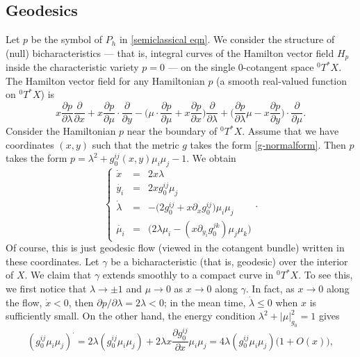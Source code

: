 \documentclass[10pt, a4paper, twoside]{amsart}
\numberwithin{equation}{section}
\theoremstyle{remark}
\begin{document}
\subsection{Geodesics}\label{subsec:geo}
Let $p$ be the symbol of $P_h$ in \eqref{semiclassical eqn}.
We consider the structure of (null) bicharacteristics --- that is, integral curves of the Hamilton vector field $H_p$ inside the characteristic variety $p = 0$ --- on the single $0$-cotangent space ${}^0 T^* X$. The Hamilton vector field for any Hamiltonian $p$ (a smooth real-valued function on ${}^0 T^* X$) is
$$x \frac{\partial p}{\partial \lambda} \frac{\partial}{\partial x} + x \frac{\partial p}{\partial \mu} \cdot \frac{\partial}{\partial y} - \bigg(\mu \cdot \frac{\partial p}{\partial \mu} + x \frac{\partial p}{\partial x}\bigg) \frac{\partial}{\partial \lambda} + \bigg(\frac{\partial p}{\partial \lambda}\mu - x \frac{\partial p}{\partial y}\bigg) \cdot \frac{\partial}{\partial \mu}.$$
Consider the Hamiltonian $p$ near the boundary of ${}^0 T^* X$. Assume that we have coordinates $(x, y)$ such that the metric $g$ takes the form \eqref{g-normalform}.
Then $p$ takes the form  $p = \lambda^2 + g_0^{ij}(x, y) \mu_i \mu_j - 1$. We obtain
\begin{equation}\label{eqn: hamilton flow-out}
\left\{ \begin{array}{ccl}
\dot{x} &=& 2x \lambda  \\
\dot{y_i} & = & 2x g_0^{ij} \mu_j  \\
\dot{\lambda} & = & -\Big(2g_0^{ij} +  x \partial_x g_0^{ij}  \Big) \mu_i \mu_j    \\
\dot{\mu_i} & = & \Big( 2\lambda\mu_i - (x \partial_{y_i}  g_0^{jk}) \mu_j \mu_k \Big) \end{array} \right..
\end{equation}
Of course, this is just geodesic flow (viewed in the cotangent bundle) written in these coordinates.
Let $\gamma$ be a bicharacteristic (that is, geodesic) over the interior of $X$. We claim that $\gamma$ extends smoothly to a compact curve in ${}^0 T^* X$. To see this, we first notice that $\lambda \to \pm1$ and $\mu \to 0$ as $x \to 0$ along $\gamma$. In fact, as $x \rightarrow 0$ along the flow, $\dot{x} < 0$, then $\partial p / \partial \lambda = 2 \lambda < 0$; in the mean time, $\dot{\lambda} \leq 0$ when $x$ is sufficiently small. On the other hand, the energy condition $\lambda^2 + |\mu|_{g_0}^2 = 1$ gives
$$
(g_0^{ij} \mu_i \mu_j)^\cdot = 2 \lambda (g_0^{ij} \mu_i \mu_j)     + 2 \lambda  x \frac{\partial g_0^{ij}}{\partial x} \mu_i \mu_j = 4 \lambda (g_0^{ij} \mu_i \mu_j)\big(1 + O(x) \big),
$$
\end{document}
